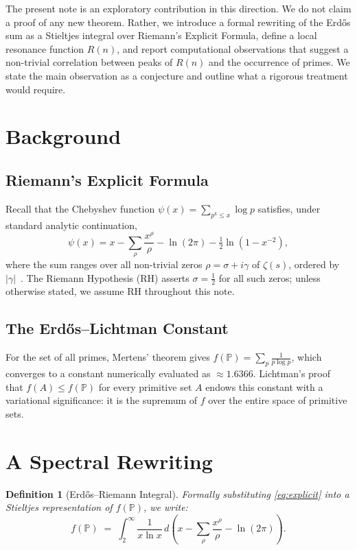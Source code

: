 \documentclass[11pt,a4paper]{article}
\newtheorem{definition}{Definition}
\begin{document}
The present note is an exploratory contribution in this direction. We do not claim
a proof of any new theorem. Rather, we introduce a formal rewriting of the Erd\H{o}s
sum as a Stieltjes integral over Riemann's Explicit Formula, define a local resonance
function $R(n)$, and report computational observations that suggest a non-trivial
correlation between peaks of $R(n)$ and the occurrence of primes. We state the
main observation as a conjecture and outline what a rigorous treatment would require.

\section{Background}

\subsection{Riemann's Explicit Formula}

Recall that the Chebyshev function $\psi(x) = \sum_{p^k \leq x} \log p$ satisfies,
under standard analytic continuation,
\begin{equation}
  \psi(x) = x - \sum_{\rho} \frac{x^{\rho}}{\rho} - \ln(2\pi) - \tfrac{1}{2}\ln(1 - x^{-2}),
  \label{eq:explicit}
\end{equation}
where the sum ranges over all non-trivial zeros $\rho = \sigma + i\gamma$ of
$\zeta(s)$, ordered by $|\gamma|$~\cite{davenport2000}.
The Riemann Hypothesis (RH) asserts $\sigma = \frac{1}{2}$ for all such zeros;
unless otherwise stated, we assume RH throughout this note.

\subsection{The Erd\H{o}s--Lichtman Constant}

For the set of all primes, Mertens' theorem gives
$f(\mathbb{P}) = \sum_{p} \frac{1}{p \log p}$,
which converges to a constant numerically evaluated as $\approx 1.6366$.
Lichtman's proof~\cite{lichtman2019} that $f(A) \leq f(\mathbb{P})$ for every
primitive set $A$ endows this constant with a variational significance: it is the
supremum of $f$ over the entire space of primitive sets.

\section{A Spectral Rewriting}

\begin{definition}[Erd\H{o}s--Riemann Integral]
Formally substituting \eqref{eq:explicit} into a Stieltjes representation of
$f(\mathbb{P})$, we write:
\begin{equation}
  f(\mathbb{P}) \;=\; \int_{2}^{\infty} \frac{1}{x \ln x}
  \, d\!\left( x - \sum_{\rho} \frac{x^{\rho}}{\rho} - \ln(2\pi) \right).
  \label{eq:erdos-riemann}
\end{equation}
\end{definition}
\end{document}
